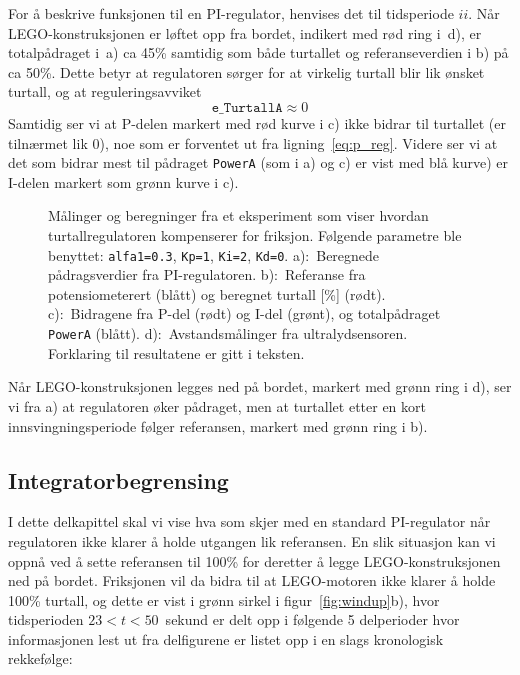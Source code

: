 For å beskrive funksjonen til en PI-regulator, henvises det til
tidsperiode $ii$. 
Når LEGO-konstruksjonen er løftet opp fra bordet, 
indikert med rød ring i~d), er totalpådraget i~a) ca 45\%  samtidig som både
turtallet og referanseverdien i b) på ca 50\%. 
Dette betyr  at regulatoren sørger for at virkelig 
turtall blir lik ønsket turtall, og at
reguleringsavviket 
\begin{equation}
  \label{eq:4}
  \mathtt{e\_{TurtallA}}\approx 0
\end{equation}
Samtidig ser vi at P-delen markert med rød kurve i c) ikke bidrar til
turtallet (er tilnærmet lik 0), noe som er
forventet ut fra ligning~\eqref{eq:p_reg}. Videre ser vi at det som
bidrar mest til pådraget {\tt PowerA} 
(som i a) og c) er vist med blå kurve)
er I-delen markert som grønn kurve i c). 
\begin{figure}[H]
  \centering
  \hspace*{-5mm}
  \caption{Målinger og beregninger fra et eksperiment som viser
    hvordan turtallregulatoren kompenserer for friksjon. Følgende
    parametre ble benyttet: {\tt alfa1=0.3}, {\tt Kp=1}, {\tt Ki=2},
    {\tt Kd=0}.
    a):~Beregnede pådragsverdier fra PI-regulatoren. 
    b):~Referanse fra potensiometerert (blått) og beregnet
    turtall [\%] (rødt). 
    c):~Bidragene fra P-del (rødt) og I-del (grønt), og totalpådraget {\tt
      PowerA} (blått). 
    d):~Avstandsmålinger fra ultralydsensoren.
    Forklaring
    til resultatene er gitt i teksten.} 
  \label{fig:turtallregulering}
\end{figure}
Når LEGO-konstruksjonen legges ned på bordet,
markert med grønn ring i d),
ser vi fra a) at regulatoren øker pådraget, men at
turtallet etter en kort innsvingningsperiode følger
referansen, markert med grønn ring i b). 


\subsection{Integratorbegrensing}
I dette delkapittel skal vi vise hva som skjer med en standard
PI-regulator når regulatoren ikke klarer å holde utgangen lik
referansen. En slik situasjon kan vi oppnå ved å sette referansen til
100\% for deretter å legge LEGO-konstruksjonen ned på
bordet. Friksjonen vil da bidra til at LEGO-motoren ikke klarer å
holde 100\% turtall, og 
dette er vist i grønn sirkel i figur~\ref{fig:windup}b), hvor
tidsperioden  $23{<}t{<}50$~sekund er delt opp i følgende 
5 delperioder hvor informasjonen lest ut fra delfigurene er listet opp
i en slags kronologisk rekkefølge:

